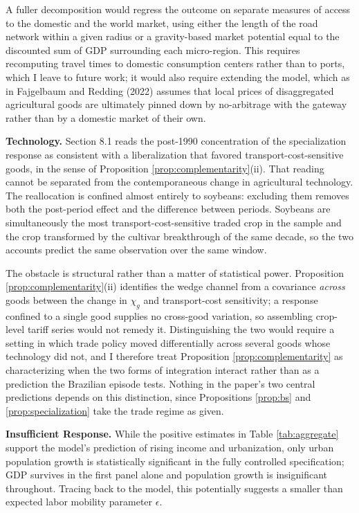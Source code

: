 \documentclass[11pt]{article}
\begin{document}
A fuller decomposition would regress the outcome on separate measures of access to the domestic and the world market, using either the length of the road network within a given radius or a gravity-based market potential equal to the discounted sum of GDP surrounding each micro-region. This requires recomputing travel times to domestic consumption centers rather than to ports, which I leave to future work; it would also require extending the model, which as in Fajgelbaum and Redding (2022) assumes that local prices of disaggregated agricultural goods are ultimately pinned down by no-arbitrage with the gateway rather than by a domestic market of their own.

\medskip\noindent \textbf{Technology.} Section 8.1 reads the post-1990 concentration of the specialization response as consistent with a liberalization that favored transport-cost-sensitive goods, in the sense of Proposition \ref{prop:complementarity}(ii). That reading cannot be separated from the contemporaneous change in agricultural technology. The reallocation is confined almost entirely to soybeans: excluding them removes both the post-period effect and the difference between periods. Soybeans are simultaneously the most transport-cost-sensitive traded crop in the sample and the crop transformed by the cultivar breakthrough of the same decade, so the two accounts predict the same observation over the same window.

The obstacle is structural rather than a matter of statistical power. Proposition \ref{prop:complementarity}(ii) identifies the wedge channel from a covariance \emph{across} goods between the change in $\chi_g$ and transport-cost sensitivity; a response confined to a single good supplies no cross-good variation, so assembling crop-level tariff series would not remedy it. Distinguishing the two would require a setting in which trade policy moved differentially across several goods whose technology did not, and I therefore treat Proposition \ref{prop:complementarity} as characterizing when the two forms of integration interact rather than as a prediction the Brazilian episode tests. Nothing in the paper's two central predictions depends on this distinction, since Propositions \ref{prop:bs} and \ref{prop:specialization} take the trade regime as given.

\medskip\noindent \textbf{Insufficient Response.} While the positive estimates in Table \ref{tab:aggregate} support the model’s prediction of rising income and urbanization, only urban population growth is statistically significant in the fully controlled specification; GDP survives in the first panel alone and population growth is insignificant throughout. Tracing back to the model, this potentially suggests a smaller than expected labor mobility parameter $\epsilon$.
\end{document}

